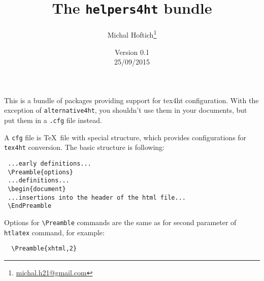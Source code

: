 \documentclass{article}
\title{The \texttt{helpers4ht} bundle}
\author{Michal Hoftich\footnote{\url{michal.h21@gmail.com}}}
\date{Version 0.1\\25/09/2015}
\begin{document}
\maketitle
\tableofcontents
% 
This is a bundle of packages providing support for tex4ht configuration. With
the exception of \texttt{alternative4ht}, you shouldn't use them in your
documents, but put them in a \texttt{.cfg} file instead. 

A \texttt{cfg} file is \TeX\ file with special structure, which provides
configurations for  \texttt{tex4ht} conversion. The basic structure is following:

\begin{verbatim}
 ...early definitions...
 \Preamble{options}
 ...definitions...
 \begin{document}
 ...insertions into the header of the html file...
 \EndPreamble 
\end{verbatim}

Options for \verb|\Preamble| commands are the same as for second parameter of 
\texttt{htlatex} command, for example:

\begin{verbatim}
  \Preamble{xhtml,2}
\end{verbatim}




\end{document}
